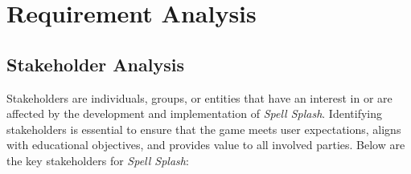 \chapter{Requirement Analysis}
\label{chap:requirement-analysis}

\section{Stakeholder Analysis}
\label{section:stakeholder-analysis}

Stakeholders are individuals, groups, or entities that have an interest in or are affected by the development and implementation of \textit{Spell Splash}. Identifying stakeholders is essential to ensure that the game meets user expectations, aligns with educational objectives, and provides value to all involved parties. Below are the key stakeholders for \textit{Spell Splash}:

\vspace{1em}

